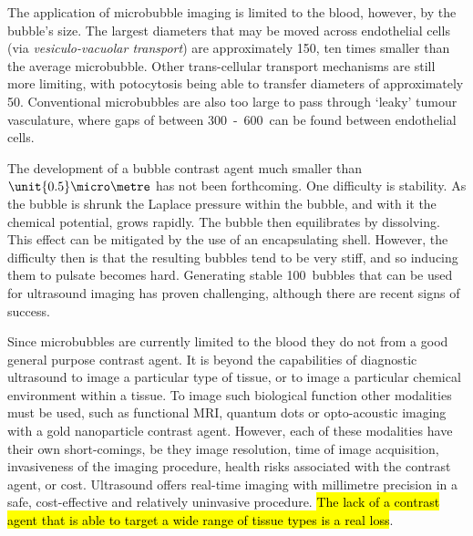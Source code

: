 The application of microbubble imaging is limited to the blood, however, by the bubble's size.
The largest diameters that may be  moved across endothelial cells (via {\em vesiculo-vacuolar transport}) are approximately \unit{150}\nano\metre\cite{Hobbs1998},
ten times smaller than the average microbubble.
Other trans-cellular transport mechanisms are still more limiting,
with potocytosis being able to transfer diameters of approximately \unit{50}\nano\metre\cite{Anderson1993,Khalil2006}.
Conventional microbubbles are also too large to pass through `leaky' tumour vasculature, where gaps of between \unit{300-600}\nano\metre\ can be found between endothelial 
cells\cite{Fukumori2006, Hashizume2000,  Hobbs1998}.


The development of a bubble contrast agent much smaller than $\unit{0.5}\micro\metre$ has not been forthcoming.
One difficulty is stability.
As the bubble is shrunk the  Laplace pressure within the bubble, and with it the chemical potential, 
grows rapidly.
The bubble then equilibrates  by dissolving.
This effect can be mitigated by the use of an encapsulating shell\cite{Ferrara2007}.
However, the difficulty then is that the resulting bubbles tend to be very stiff, 
and so inducing them to pulsate becomes hard\cite{Bloch2005,Zhanwen2010,Borkent2007}.
Generating stable \unit{100}\nano\metre\  bubbles that can be used for ultrasound imaging has proven challenging,
although there are recent signs of success\cite{Zhanwen2010, Weijs2012}.

Since microbubbles are currently limited to the blood 
they do not from a good general purpose contrast agent.
It is beyond the capabilities of diagnostic ultrasound
to image a particular type of tissue,
or to image a particular chemical environment within a tissue.
To image such biological function other modalities must be used,
such as  
functional MRI\cite{Lanza2004a},
quantum dots\cite{Ballou2004} or
opto-acoustic imaging with a gold nanoparticle contrast agent\cite{Copland2004}.
However, each of these modalities have their own short-comings,
be they image resolution, time of image acquisition, 
invasiveness of the imaging procedure, 
health risks associated with the contrast agent,
or cost.
Ultrasound offers real-time imaging with millimetre precision
in a safe, cost-effective and relatively uninvasive procedure.
\hl{The lack of a contrast agent that is able to target a wide range of tissue types is a real loss}.

